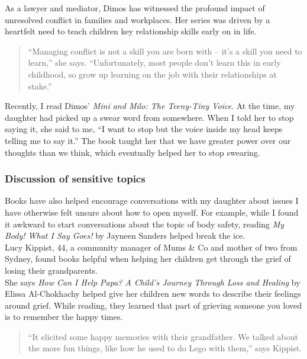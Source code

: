\documentclass[a4paper]{article}
\begin{document}
As a lawyer and mediator, Dimos has witnessed the profound impact of unresolved conflict in families and workplaces. Her series was driven by a heartfelt need to teach children key relationship skills early on in life.\\

\begin{quote}
``Managing conflict is not a skill you are born with – it’s a skill you need to learn,'' she says. ``Unfortunately, most people don’t learn this in early childhood, so grow up learning on the job with their relationships at stake.''\\
\end{quote}

Recently, I read Dimos’ \textit{Mini and Milo: The Teeny-Tiny Voice}. At the time, my daughter had picked up a swear word from somewhere. When I told her to stop saying it, she said to me, ``I want to stop but the voice inside my head keeps telling me to say it.'' The book taught her that we have greater power over our thoughts than we think, which eventually helped her to stop swearing.\\

\subsubsection*{Discussion of sensitive topics}

Books have also helped encourage conversations with my daughter about issues I have otherwise felt unsure about how to open myself. For example, while I found it awkward to start conversations about the topic of body safety, reading \textit{My Body! What I Say Goes!} by Jayneen Sanders helped break the ice.\\

Lucy Kippist, 44, a community manager of Mums \& Co and mother of two from Sydney, found books helpful when helping her children get through the grief of losing their grandparents.\\

She says \textit{How Can I Help Papa? A Child’s Journey Through Loss and Healing} by Elissa Al-Chokhachy helped give her children new words to describe their feelings around grief. While reading, they learned that part of grieving someone you loved is to remember the happy times.\\

\begin{quote}
``It elicited some happy memories with their grandfather. We talked about the more fun things, like how he used to do Lego with them,'' says Kippist.\\
\end{quote}
\end{document}
